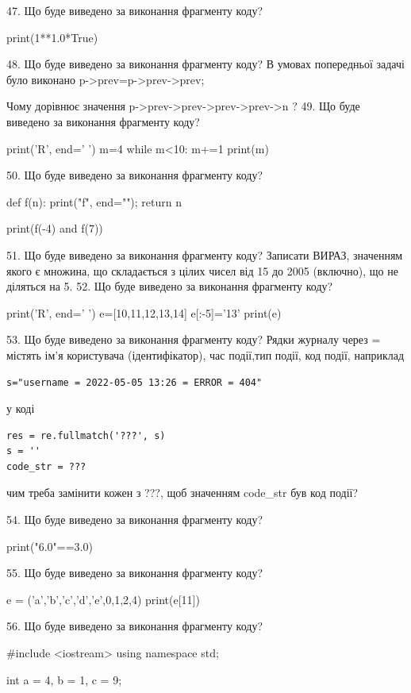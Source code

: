 \documentclass[11pt]{article}
\begin{document}
47. Що буде виведено за виконання фрагменту коду?

print(1**1.0*True)

48. Що буде виведено за виконання фрагменту коду?
В умовах попередньої задачі було виконано p->prev=p->prev->prev;

Чому дорівнює значення p->prev->prev->prev->prev->n ?
49. Що буде виведено за виконання фрагменту коду?

print('R', end=' ')
m=4
while m<10:
    m+=1
print(m)


50. Що буде виведено за виконання фрагменту коду?

def f(n):
    print("f", end="");
    return n

print(f(-4) and f(7))

51. Що буде виведено за виконання фрагменту коду?
Записати ВИРАЗ, значенням якого є множина, що складається з цілих чисел від 15 до 2005 (включно), що не діляться на 5.
52. Що буде виведено за виконання фрагменту коду?

print('R', end=' ')
e=[10,11,12,13,14]
e[:-5]='13'
print(e)


53. Що буде виведено за виконання фрагменту коду?
Рядки журналу через = містять ім'я користувача (ідентифікатор), час події,тип події, код події, наприклад
\begin{verbatim}
s="username = 2022-05-05 13:26 = ERROR = 404"
\end{verbatim}
у коді 
\begin{verbatim}
res = re.fullmatch('???', s) 
s = ''
code_str = ??? 
\end{verbatim}
чим треба замінити кожен з ???, щоб значенням code\_str був код події? 



54. Що буде виведено за виконання фрагменту коду?

print("6.0"==3.0)

55. Що буде виведено за виконання фрагменту коду?

e = ('a','b','c','d','e',0,1,2,4)
print(e[11])


56. Що буде виведено за виконання фрагменту коду?

#include <iostream>
using namespace std;

int a = 4, b = 1, c = 9;
\end{document}
